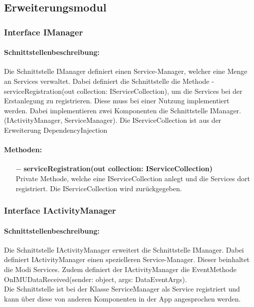 \documentclass[a4paper,12pt]{article}
\begin{document}
\subsection{Erweiterungsmodul}
\begin{center}
\end{center}
	\subsubsection{Interface IManager}
	\paragraph{Schnittstellenbeschreibung:}
	Die Schnittstelle IManager definiert einen Service-Manager, welcher eine Menge an Services verwaltet. Dabei definiert die Schnittstelle die Methode -serviceRegistration(out collection: IServiceCollection), um die Services bei der Erstanlegung zu registrieren. Diese muss bei einer Nutzung implementiert werden. Dabei implementieren zwei Komponenten die Schnittstelle IManager. (IActivityManager, ServiceManager). Die IServiceCollection ist aus der Erweiterung \Gls{DependencyInjection}
	
	\paragraph{Methoden:}
	\begin{itemize}
		\item[$-$] \textbf{serviceRegistration(out collection: IServiceCollection)}\\Private Methode, welche eine IServiceCollection anlegt und die Services dort registriert. Die IServiceCollection wird zurückgegeben. 
	\end{itemize}
	
	\subsubsection{Interface IActivityManager}
	\paragraph{Schnittstellenbeschreibung:}
	Die Schnittstelle IActivityManager erweitert die Schnittstelle IManager. Dabei definiert IActivityManager einen spezielleren Service-Manager. Dieser beinhaltet die Modi Services. Zudem definiert der IActivityManager die EventMethode OnIMUDataReceived(sender: object, args: DataEventArgs).\\
	Die Schnittstelle ist bei der Klasse ServiceManager als Service registriert und kann über diese von anderen Komponenten in der App angesprochen werden.
	
\end{document}

